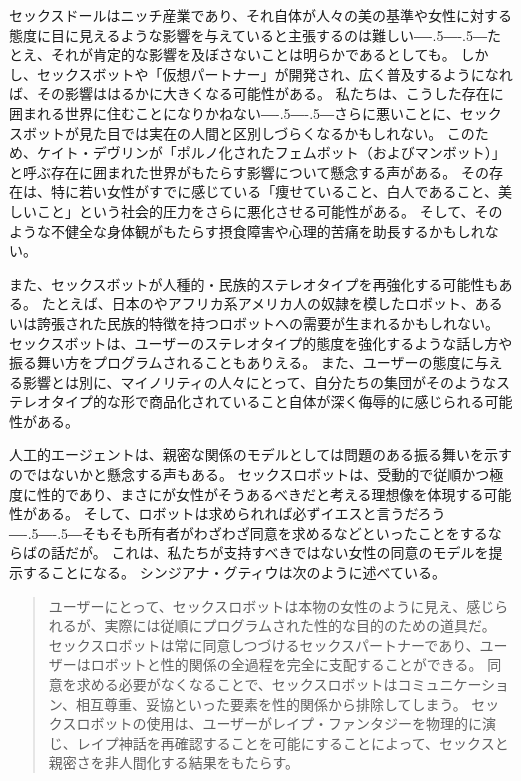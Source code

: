 \documentclass[paper=a4,book,openany]{jlreq}
\def\DDASH{―\kern-.5\zw―\kern-.5\zw―}
\begin{document}
セックスドールはニッチ産業であり、それ自体が人々の美の基準や女性に対する態度に目に見えるような影響を与えていると主張するのは難しい{\DDASH}たとえ、それが肯定的な影響を及ぼさないことは明らかであるとしても。
しかし、セックスボットや「仮想パートナー」が開発され、広く普及するようになれば、その影響ははるかに大きくなる可能性がある。
私たちは、こうした存在に囲まれる世界に住むことになりかねない{\DDASH}さらに悪いことに、セックスボットが見た目では実在の人間と区別しづらくなるかもしれない。
このため、ケイト・デヴリンが「ポルノ化されたフェムボット（およびマンボット）」と呼ぶ存在に囲まれた世界がもたらす影響について懸念する声がある\citep[cf.][]{devlin19:_turned}。
その存在は、特に若い女性がすでに感じている「痩せていること、白人であること、美しいこと」という社会的圧力をさらに悪化させる可能性がある。
そして、そのような不健全な身体観がもたらす摂食障害や心理的苦痛を助長するかもしれない。

また、セックスボットが人種的・民族的ステレオタイプを再強化する可能性もある。
たとえば、日本のやアフリカ系アメリカ人の奴隷を模したロボット、あるいは誇張された民族的特徴を持つロボットへの需要が生まれるかもしれない。
セックスボットは、ユーザーのステレオタイプ的態度を強化するような話し方や振る舞い方をプログラムされることもありえる。
また、ユーザーの態度に与える影響とは別に、マイノリティの人々にとって、自分たちの集団がそのようなステレオタイプ的な形で商品化されていること自体が深く侮辱的に感じられる可能性がある。

人工的エージェントは、親密な関係のモデルとしては問題のある振る舞いを示すのではないかと懸念する声もある。
セックスロボットは、受動的で従順かつ極度に性的であり、まさにが女性がそうあるべきだと考える理想像を体現する可能性がある。
そして、ロボットは求められれば必ずイエスと言うだろう{\DDASH}そもそも所有者がわざわざ同意を求めるなどといったことをするならばの話だが。
これは、私たちが支持すべきではない女性の同意のモデルを提示することになる。
シンジアナ・グティウは次のように述べている。

\begin{quote}
 ユーザーにとって、セックスロボットは本物の女性のように見え、感じられるが、実際には従順にプログラムされた性的な目的のための道具だ。
セックスロボットは常に同意しつづけるセックスパートナーであり、ユーザーはロボットと性的関係の全過程を完全に支配することができる。
同意を求める必要がなくなることで、セックスロボットはコミュニケーション、相互尊重、妥協といった要素を性的関係から排除してしまう。
セックスロボットの使用は、ユーザーがレイプ・ファンタジーを物理的に演じ、レイプ神話を再確認することを可能にすることによって、セックスと親密さを非人間化する結果をもたらす。
\citep[p.187]{gutiu16:_robot_consen}
\end{quote}
\end{document}
